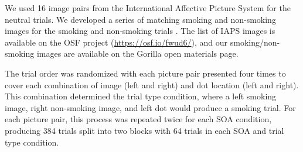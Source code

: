\documentclass[empirical, authordate, issue]{jote-new-article}
\begin{document}
We used 16 image pairs from the International Affective Picture System \parencite{Lang2008} for the neutral trials. We developed a series of matching smoking and non-smoking images for the smoking and non-smoking trials \parencite{Bartlett2020}. The list of IAPS images is available on the OSF project (\url{https://osf.io/fwud6/}), and our smoking/non-smoking images are available on the Gorilla open materials page.

The trial order was randomized with each picture pair presented four times to cover each combination of image (left and right) and dot location (left and right). This combination determined the trial type condition, where a left smoking image, right non-smoking image, and left dot would produce a smoking trial. For each picture pair, this process was repeated twice for each SOA condition, producing 384 trials split into two blocks with 64 trials in each SOA and trial type condition.
\end{document}
